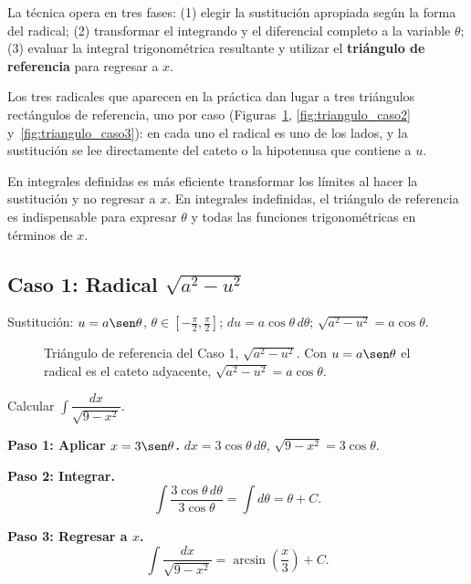La técnica opera en tres fases: (1) elegir la sustitución apropiada según la
forma del radical; (2) transformar el integrando y el diferencial completo
a la variable $\theta$; (3) evaluar la integral trigonométrica resultante y
utilizar el \textbf{triángulo de referencia} para regresar a $x$.

Los tres radicales que aparecen en la práctica dan lugar a tres triángulos
rectángulos de referencia, uno por caso
(Figuras~\ref{fig:triangulo_caso1}, \ref{fig:triangulo_caso2}
y~\ref{fig:triangulo_caso3}): en cada uno el radical es uno de los lados, y
la sustitución se lee directamente del cateto o la hipotenusa que contiene a
$u$.

\begin{rem}
En integrales definidas es más eficiente transformar los límites al hacer la
sustitución y no regresar a $x$. En integrales indefinidas, el triángulo de
referencia es indispensable para expresar $\theta$ y todas las funciones
trigonométricas en términos de $x$.
\end{rem}

\subsection{Caso 1: Radical $\sqrt{a^2 - u^2}$}

Sustitución: $u = a\sen\theta$, $\theta \in \left[-\frac{\pi}{2},
\frac{\pi}{2}\right]$; $du = a\cos\theta\,d\theta$;
$\sqrt{a^2-u^2} = a\cos\theta$.

\begin{figure}[!htbp]
\centering
{}
\caption{Triángulo de referencia del Caso 1, $\sqrt{a^2-u^2}$. Con $u=a\sen\theta$ el radical es el cateto adyacente, $\sqrt{a^2-u^2}=a\cos\theta$.}
\label{fig:triangulo_caso1}
\end{figure}

\begin{example}
Calcular $\displaystyle\int \dfrac{dx}{\sqrt{9-x^2}}$.

\begin{myproof}

\textbf{Paso 1: Aplicar $x=3\sen\theta$.}
$dx=3\cos\theta\,d\theta$, $\sqrt{9-x^2}=3\cos\theta$.

\textbf{Paso 2: Integrar.}
\[
\int\frac{3\cos\theta\,d\theta}{3\cos\theta}=\int d\theta=\theta+C.
\]

\textbf{Paso 3: Regresar a $x$.}
\[
\boxed{\int \frac{dx}{\sqrt{9-x^2}} =\arcsin\!\left(\frac{x}{3}\right)+C.}
\]
\end{myproof}
\end{example}

